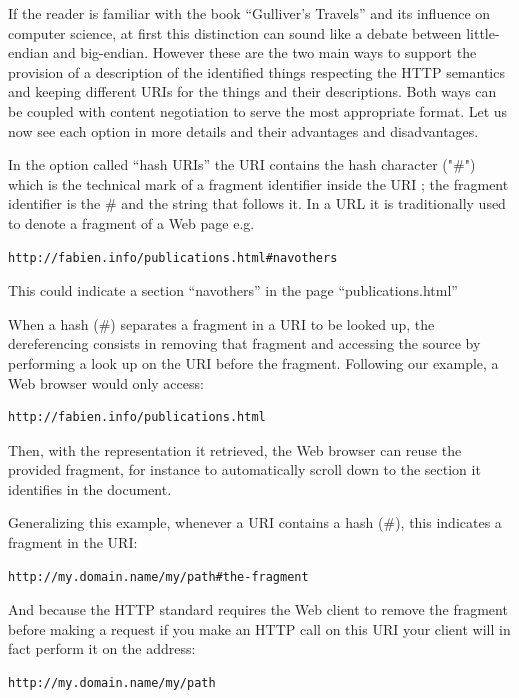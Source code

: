 If the reader is familiar with the book ``Gulliver's Travels'' and its
influence on computer science, at first this distinction can sound like
a debate between little-endian and big-endian. However these are the two
main ways to support the provision of a description of the identified
things respecting the HTTP semantics and keeping different URIs for the
things and their descriptions. Both ways can be coupled with content
negotiation to serve the most appropriate format. Let us now see each
option in more details and their advantages and disadvantages.

In the option called ``hash URIs'' the URI contains the hash character
("\#") which is the technical mark of a fragment identifier inside the
URI ; the fragment identifier is the \# and the string that follows it.
In a URL it is traditionally used to denote a fragment of a Web page
e.g.

\begin{lstlisting}
http://fabien.info/publications.html#navothers
\end{lstlisting}

This could indicate a section ``navothers'' in the page
``publications.html''

When a hash (\#) separates a fragment in a URI to be looked up, the
dereferencing consists in removing that fragment and accessing the
source by performing a look up on the URI before the fragment. Following
our example, a Web browser would only access:

\begin{lstlisting}
http://fabien.info/publications.html
\end{lstlisting}

Then, with the representation it retrieved, the Web browser can reuse
the provided fragment, for instance to automatically scroll down to the
section it identifies in the document.

Generalizing this example, whenever a URI contains a hash (\#), this
indicates a fragment in the URI:

\begin{lstlisting}
http://my.domain.name/my/path#the-fragment
\end{lstlisting}


And because the HTTP standard requires the Web client to remove the
fragment before making a request if you make an HTTP call on this URI
your client will in fact perform it on the address:

\begin{lstlisting}
http://my.domain.name/my/path
\end{lstlisting}


